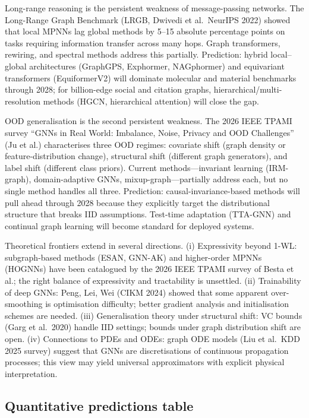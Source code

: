 \documentclass{article}
\begin{document}
Long-range reasoning is the persistent weakness of message-passing networks. The Long-Range Graph Benchmark (LRGB, Dwivedi et al.~NeurIPS 2022) showed that local MPNNs lag global methods by 5--15 absolute percentage points on tasks requiring information transfer across many hops. Graph transformers, rewiring, and spectral methods address this partially. Prediction: hybrid local--global architectures (GraphGPS, Exphormer, NAGphormer) and equivariant transformers (EquiformerV2) will dominate molecular and material benchmarks through 2028; for billion-edge social and citation graphs, hierarchical/multi-resolution methods (HGCN, hierarchical attention) will close the gap.

OOD generalisation is the second persistent weakness. The 2026 IEEE TPAMI survey ``GNNs in Real World: Imbalance, Noise, Privacy and OOD Challenges'' (Ju et al.) characterises three OOD regimes: covariate shift (graph density or feature-distribution change), structural shift (different graph generators), and label shift (different class priors). Current methods---invariant learning (IRM-graph), domain-adaptive GNNs, mixup-graph---partially address each, but no single method handles all three. Prediction: causal-invariance-based methods will pull ahead through 2028 because they explicitly target the distributional structure that breaks IID assumptions. Test-time adaptation (TTA-GNN) and continual graph learning will become standard for deployed systems.

Theoretical frontiers extend in several directions. (i) Expressivity beyond 1-WL: subgraph-based methods (ESAN, GNN-AK) and higher-order MPNNs (HOGNNs) have been catalogued by the 2026 IEEE TPAMI survey of Besta et al.; the right balance of expressivity and tractability is unsettled. (ii) Trainability of deep GNNs: Peng, Lei, Wei (CIKM 2024) showed that some apparent over-smoothing is optimisation difficulty; better gradient analysis and initialisation schemes are needed. (iii) Generalisation theory under structural shift: VC bounds (Garg et al.~2020) handle IID settings; bounds under graph distribution shift are open. (iv) Connections to PDEs and ODEs: graph ODE models (Liu et al.~KDD 2025 survey) suggest that GNNs are discretisations of continuous propagation processes; this view may yield universal approximators with explicit physical interpretation.

\subsection{Quantitative predictions table}\label{quantitative-predictions-table}
\end{document}
